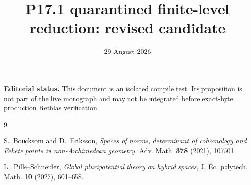 \documentclass[11pt]{article}
\title{P17.1 quarantined finite-level reduction: revised candidate}
\author{}
\date{29 August 2026}
\theoremstyle{remark}
\begin{document}
\maketitle

\noindent
\textbf{Editorial status.}
This document is an isolated compile test. Its proposition is not part of
the live monograph and may not be integrated before exact-byte production
Rethlas verification.




\begin{thebibliography}{9}

S.~Boucksom and D.~Eriksson,
\emph{Spaces of norms, determinant of cohomology and Fekete points in
non-Archimedean geometry}, Adv. Math. \textbf{378} (2021), 107501.

L.~Pille--Schneider,
\emph{Global pluripotential theory on hybrid spaces},
J. \'{E}c. polytech. Math. \textbf{10} (2023), 601--658.

\end{thebibliography}
\end{document}
